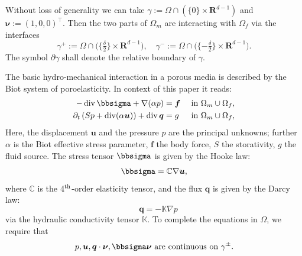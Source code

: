 \documentclass[a4paper]{article}
\def\CC{\tn C}
\def\div{\operatorname{div}}
\def\dt{\prtl_t}
\def\ff{\vc f}
\def\nnu{\vc\nu}
\def\prtl{\partial}
\def\qq{\vc q}
\def\Real{{\mathbf R}}
\def\tn#1{{\mathbb{#1}}}    %
\def\uu{\vc u}
\def\vc#1{\mathbf{\boldsymbol{#1}}}     %
\newcommand{\eq}[1]{\begin{equation}#1\end{equation}}
\begin{document}
Without loss of generality we can take $\gamma:=\Omega\cap\left(\{0\}\times\Real^{d-1}\right)$ and $\nnu:=(1,0,0)^\top$.
Then the two parts of $\Omega_m$ are interacting with $\Omega_f$ via the interfaces
\eq{ \gamma^+:=\Omega\cap\big( \{\tfrac\delta2\}\times \Real^{d-1}\big), \quad \gamma^-:=\Omega\cap\big( \{ -\tfrac\delta2\}\times \Real^{d-1}\big). }
The symbol $\prtl\gamma$ shall denote the relative boundary of $\gamma$.

The basic hydro-mechanical interaction in a porous media is described by the Biot system of poroelasticity.
In context of this paper it reads:
\begin{subequations}
\label{eq:biot}
\begin{align}
    \label{eq:lin_el}
    -\div \bbsigma + \nabla(\alpha p) &= \ff &&\mbox{ in }\Omega_m\cup\Omega_f,\\
\label{eq:biot_darcy}    \dt\left(Sp + \div(\alpha\uu)\right) + \div\qq &= g &&\mbox{ in }\Omega_m\cup\Omega_f,
\end{align}
\end{subequations}
Here, the displacement $\uu$ and the pressure $p$ are the principal unknowns; further $\alpha$ is the Biot effective stress parameter, $\ff$ the body force, $S$ the storativity, $g$ the fluid source.
The stress tensor $\bbsigma$ is given by the Hooke law:
\eq{ \bbsigma = \CC\nabla\uu, }
where $\CC$ is the $4^{\rm th}$-order elasticity tensor, and the flux $\qq$ is given by the Darcy law:
\eq{ \quad \qq = -\tn K\nabla p }
via the hydraulic conductivity tensor $\tn K$.
To complete the equations in $\Omega$, we require that
\eq{ \label{eq:continuity_on_gamma_pm} p,\uu,\qq\cdot\nnu,\bbsigma\nnu \mbox{ are continuous on } \gamma^\pm. }
\end{document}
